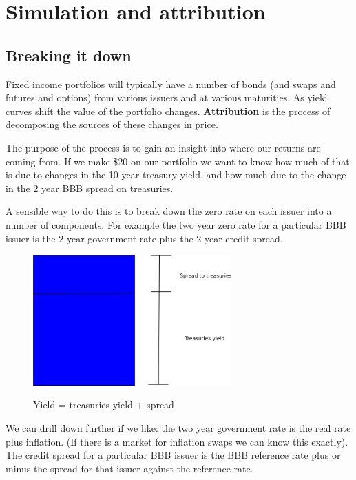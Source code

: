 \section{Simulation and attribution}

\subsection{Breaking it down}
Fixed income portfolios will typically have a number of bonds (and swaps and futures and options) from various issuers and at various maturities. As yield curves shift the value of the portfolio changes.  \textbf{Attribution} is the process of decomposing the sources of these changes in price.

The purpose of the process is to gain an insight into where our returns are coming from. If we make \$20 on our portfolio we want to know how much of that is due to changes in the 10 year treasury yield, and how much due to the change in the 2 year BBB spread on treasuries. 

A sensible way to do this is to break down the zero rate on each issuer into a number of components. For example the two year zero rate for a particular BBB issuer is the 2 year government rate plus the 2 year credit spread. 

\begin{figure}[htbp]
\begin{center}
  \includegraphics[width=3in]{pics/yCurveDec1.png} \\
  \caption{Yield = treasuries yield + spread}
\label{yCurveDec1}
\end{center}
\end{figure}

We can drill down further if we like: the two year government rate is the real rate plus inflation. (If there is a market for inflation swaps we can know this exactly). The credit spread for a particular BBB issuer is the BBB reference rate plus or minus the spread for that issuer against the reference rate. 

